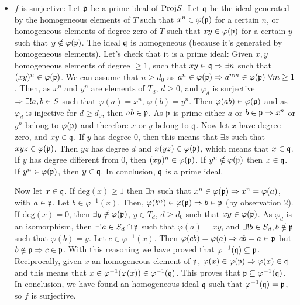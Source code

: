 \begin{sol}
\begin{enumerate}[label=\alph*)]
\begin{itemize}
			\item $f$ is surjective: Let $\mathfrak{p}$ be a prime ideal of $\mathrm{Proj} S$. Let $\mathfrak{q}$ be the ideal generated by the homogeneous elements of $T$ such that $x^n \in \varphi(\mathfrak{p})$ for a certain $n$, or homogeneous elements of degree zero of $T$ such that $xy \in \varphi(\mathfrak{p})$ for a certain $y$ such that $y \notin \varphi(\mathfrak{p})$. The ideal $\mathfrak{q}$ is homogeneous (because it's generated by homogeneous elements). Let's check that it is a prime ideal: Given $x,y$ homogeneous elements of degree $\geq 1$, such that $xy \in \mathfrak{q} \Rightarrow \exists n$ such that $(xy)^n \in \varphi(\mathfrak{p})$. We can assume that $n \geq d_0$ as $a^n \in \varphi(\mathfrak{p}) \Rightarrow a^{nm} \in \varphi(\mathfrak{p}) \, \, \forall m \geq 1$. Then, as $x^n$ and $y^n$ are elements of $T_d$, $d \geq 0$, and $\varphi_d$ is surjective $\Rightarrow \exists! a,b \in S$ such that $\varphi(a) = x^n, \, \varphi(b) = y^n$. Then $\varphi(ab) \in \varphi(\mathfrak{p})$ and as $\varphi_d$ is injective for $d \geq d_0$, then $ab \in \mathfrak{p}$. As $\mathfrak{p}$ is prime either $a$ or $b \in \mathfrak{p} \Rightarrow x^n$ or $y^n$ belong to $\varphi(\mathfrak{p})$ and therefore $x$ or $y$ belong to $\mathfrak{q}$. Now let $x$ have degree zero, and $xy \in \mathfrak{q}$. If $y$ has degree $0$, then this means that $\exists z$ such that $xyz \in \varphi(\mathfrak{p})$. Then $yz$ has degree $d$ and $x(yz) \in \varphi(\mathfrak{p})$, which means that $x \in \mathfrak{q}$. If $y$ has degree different from $0$, then $(xy)^n \in \varphi(\mathfrak{p})$. If $y^n \notin \varphi(\mathfrak{p})$ then $x \in \mathfrak{q}$. If $y^n \in \varphi(\mathfrak{p})$, then $y \in \mathfrak{q}$. In conclusion, $\mathfrak{q}$ is a prime ideal.

			Now let $x \in \mathfrak{q}$. If $\mathrm{deg}(x) \geq 1$ then $\exists n$ such that $x^n \in \varphi(\mathfrak{p}) \Rightarrow x^n = \varphi(a)$, with $a \in \mathfrak{p}$. Let $b \in \varphi^{-1}(x)$. Then, $\varphi(b^n) \in \varphi(\mathfrak{p}) \Rightarrow b \in \mathfrak{p}$ (by observation 2). If $\mathrm{deg}(x) = 0$, then $\exists y \notin \varphi(\mathfrak{p})$, $y \in T_d$, $d \geq d_0$ such that $xy \in \varphi(\mathfrak{p})$. As $\varphi_d$ is an isomorphism, then $\exists! a \in S_d \cap \mathfrak{p}$ such that $\varphi(a) = xy$, and $\exists! b \in S_d, b \notin \mathfrak{p}$ such that $\varphi(b) = y$. Let $c \in \varphi^{-1}(x)$. Then $\varphi(cb) = \varphi(a) \Rightarrow cb = a \in \mathfrak{p}$ but $b \notin \mathfrak{p} \Rightarrow c \in \mathfrak{p}$. With this reasoning we have proved that $\varphi^{-1}(\mathfrak{q}) \subseteq \mathfrak{p}$. Reciprocally, given $x$ an homogeneous element of $\mathfrak{p}$, $\varphi(x) \in \varphi(\mathfrak{p}) \Rightarrow \varphi(x) \in \mathfrak{q}$ and this means that $x \in \varphi^{-1}(\varphi(x)) \in \varphi^{-1}(\mathfrak{q})$. This proves that $\mathfrak{p} \subseteq \varphi^{-1}(\mathfrak{q})$. In conclusion, we have found an homogeneous ideal $\mathfrak{q}$ such that $\varphi^{-1}(\mathfrak{q}) = \mathfrak{p}$, so $f$ is surjective.


\end{itemize}
\end{enumerate}
\end{sol}
